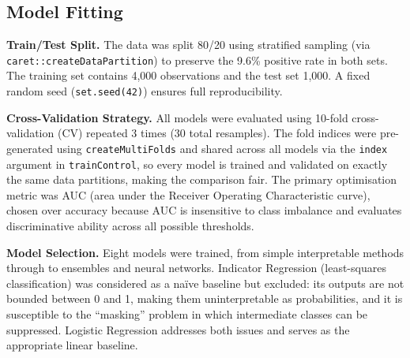 \subsection{Model Fitting}\label{sec:fitting}

\noindent\textbf{Train/Test Split.}
The data was split 80/20 using stratified sampling (via \texttt{caret::createDataPartition}) to preserve the 9.6\% positive rate in both sets. The training set contains 4,000 observations and the test set 1,000. A fixed random seed (\texttt{set.seed(42)}) ensures full reproducibility.

\noindent\textbf{Cross-Validation Strategy.}
All models were evaluated using 10-fold cross-validation (CV) repeated 3 times (30 total resamples). The fold indices were pre-generated using \texttt{createMultiFolds} and shared across all models via the \texttt{index} argument in \texttt{trainControl}, so every model is trained and validated on exactly the same data partitions, making the comparison fair. The primary optimisation metric was AUC (area under the Receiver Operating Characteristic curve), chosen over accuracy because AUC is insensitive to class imbalance and evaluates discriminative ability across all possible thresholds.

\noindent\textbf{Model Selection.}
Eight models were trained, from simple interpretable methods through to ensembles and neural networks. Indicator Regression (least-squares classification) was considered as a na\"ive baseline but excluded: its outputs are not bounded between 0 and 1, making them uninterpretable as probabilities, and it is susceptible to the ``masking'' problem in which intermediate classes can be suppressed. Logistic Regression addresses both issues and serves as the appropriate linear baseline.


